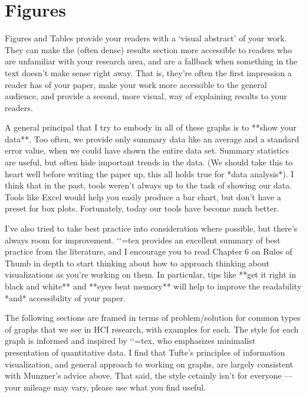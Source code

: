 
%
%


\section{Figures}
\label{sec:figures}

\begin{markdown}
Figures and Tables provide your readers with a ‘visual abstract’ of your work. They can make the (often dense) results section more accessible to readers who are unfamiliar with your research area, and are a fallback when something in the text doesn't make sense right away. That is, they're often the first impression a reader has of your paper, make your work more accessible to the general audience, and provide a second, more visual, way of explaining results to your readers.

A general principal that I try to embody in all of these graphs is to **show your data**. Too often, we provide only summary data like an average and a standard error value, when we could have shown the entire data set. Summary statistics are useful, but often hide important trends in the data. (We should take this to heart well before writing the paper up, this all holds true for *data analysis*). I think that in the past, tools weren't always up to the task of showing our data. Tools like Excel would help you easily produce a bar chart, but don't have a preset for box plots. Fortunately, today our tools have become much better. 

I've also tried to take best practice into consideration where possible, but there's always room for improvement. `\citet{munznervisualization}`{=tex} provides an excellent summary of best practice from the literature, and I encourage you to read Chapter 6 on Rules of Thumb in depth to start thinking about how to approach thinking about visualizations as you're working on them. In particular, tips like **get it right in black and white** and **eyes beat memory** will help to improve the readability *and* accessibility of your paper. 

The following sections are framed in terms of problem/solution for common types of graphs that we see in HCI research, with examples for each. The style for each graph is informed and inspired by `\citet{tufte1983visual}`{=tex}, who emphasizes minimalist presentation of quantitative data. I find that Tufte's principles of information visualization, and general approach to working on graphs, are largely consistent with Munzner's advice above. That said, the style cetainly isn't for everyone --- your mileage may vary, please use what you find useful.  


 \end{markdown}
 
